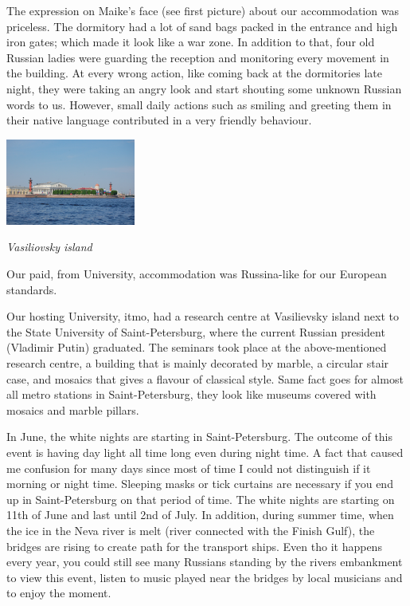 \documentclass[10pt,a4paper]{article} %
\begin{document}
\begin{multicols}{3}
The expression on Maike's face (see first picture) about our accommodation was 
priceless. 
The dormitory had a lot of sand bags packed in the entrance and high iron gates; 
which made it look like a war zone.  
In addition to that, four old Russian ladies were guarding the reception and 
monitoring every movement in the building. 
At every wrong action, like coming back at the dormitories late night, they 
were taking an angry look and start shouting some unknown Russian words to us. 
However, small daily actions such as smiling and greeting them in their native 
language contributed in a very friendly behaviour.  


\begin{center}
	\includegraphics[width=0.32\textwidth]{media/spb_1.jpg}
	\par\textit{Vasiliovsky island}
\end{center}


Our paid, from University, accommodation was Russina-like for our European 
standards.


Our hosting University, {\sc itmo}, had a research centre at Vasilievsky island 
next to the State University of Saint-Petersburg, where the current Russian 
president (Vladimir Putin) graduated. 
The seminars took place at the above-mentioned research centre, a building that 
is mainly decorated by marble, a circular stair case, 
and mosaics that gives a flavour of classical style. 
Same fact goes for almost all metro stations in Saint-Petersburg, they look like 
museums covered with mosaics and marble pillars. 

 
In June, the white nights are starting in Saint-Petersburg. 
The outcome of this event is having day light all time long even during night 
time. 
A fact that caused me confusion for many days since most of time I could not 
distinguish if it morning or night time. 
Sleeping masks or tick curtains are necessary if you end up in Saint-Petersburg 
on that period of time. 
The white nights are starting on 11th of June and last until 2nd of July.
In addition, during summer time, when the ice in the Neva river is melt (river 
connected with the Finish Gulf), the bridges are rising to create path for the 
transport ships. 
Even tho it happens every year, you could still see many Russians standing by the 
rivers embankment to view this event, listen to music played near the bridges by 
local musicians and to enjoy the moment.
 

\end{multicols}
\end{document}
